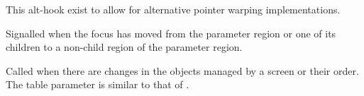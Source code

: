 \begin{function}
    \begin{funcdesc}
      This alt-hook exist to allow for alternative pointer warping
      implementations.
    \end{funcdesc}
\end{function}


\begin{function}
    \begin{funcdesc}
      Signalled when the focus has moved from the parameter region or
      one of its children to a non-child region of the parameter region.
    \end{funcdesc}
\end{function}


\begin{function}
    \begin{funcdesc}
      Called when there are changes in the objects managed by a screen
      or their order. The table parameter is similar to that of
      .
    \end{funcdesc}
\end{function}
